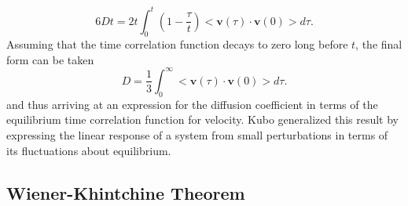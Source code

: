 \documentclass[aps,prb,preprint,preprintnumbers,amsmath,amssymb,floatfix,superscriptaddress]{revtex4}
\begin{document}
%
\begin{equation}
6Dt=2t\int_0^t\left(1-\frac{\tau}{t}\right)<\pmb{v}(\tau)\cdot\pmb{v}(0)>d\tau.
\end{equation}
%
Assuming that the time correlation function decays to zero long before $t$, the final form can be taken
%
\begin{equation}
D=\frac{1}{3}\int_0^{\infty}<\pmb{v}(\tau)\cdot\pmb{v}(0)>d\tau.
\end{equation}
%
and thus arriving at an expression for the diffusion coefficient in terms of the equilibrium time correlation function for velocity. Kubo generalized this result by expressing the linear response of a system from small perturbations in terms of its fluctuations about equilibrium.

\subsection*{Wiener-Khintchine Theorem}
\end{document}
